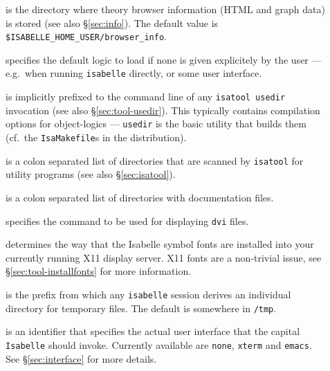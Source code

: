 \begin{description}
\item[] is the directory where theory
  browser information (HTML and graph data) is stored (see also
  \S\ref{sec:info}).  The default value is
  \texttt{\$ISABELLE_HOME_USER/browser_info}.

\item[] specifies the default logic to load if
  none is given explicitely by the user --- e.g.\ when running
  \texttt{isabelle} directly, or some user interface.

\item[] is implicitly prefixed to the
  command line of any \texttt{isatool usedir} invocation (see also
  \S\ref{sec:tool-usedir}). This typically contains compilation
  options for object-logics --- \texttt{usedir} is the basic utility
  that builds them (cf.\ the \texttt{IsaMakefile}s in the
  distribution).

\item[] is a colon separated list of
  directories that are scanned by \texttt{isatool} for utility
  programs (see also \S\ref{sec:isatool}).

\item[] is a colon separated list of directories
  with documentation files.

\item[] specifies the command to be used for
  displaying \texttt{dvi} files.

\item[] determines the way that the
  Isabelle symbol fonts are installed into your currently running X11
  display server. X11 fonts are a non-trivial issue, see
  \S\ref{sec:tool-installfonts} for more information.

\item[] is the prefix from which any
  \texttt{isabelle} session derives an individual directory for
  temporary files.  The default is somewhere in \texttt{/tmp}.

\item[] is an identifier that specifies the
  actual user interface that the capital \texttt{Isabelle} should
  invoke.  Currently available are \texttt{none}, \texttt{xterm} and
  \texttt{emacs}. See \S\ref{sec:interface} for more details.

\end{description}


